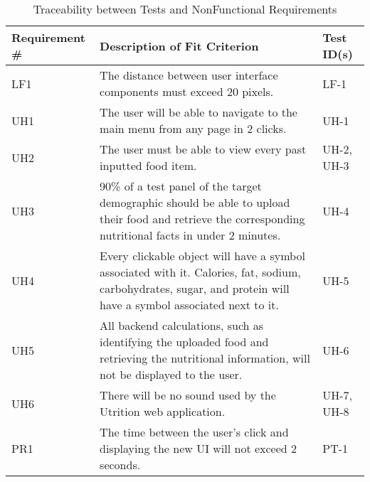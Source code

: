 \documentclass[12pt, titlepage]{article}
\begin{document}
	\begin{table}[H]
		\caption{Traceability between Tests and NonFunctional Requirements}
		\begin{tabularx}{\linewidth}{|l|X|l|}
			\hline
			{\bf Requirement \#} & {\bf Description of Fit Criterion} & {\bf Test ID(s)}\\
			\hline
			LF1 & The distance between user interface components must exceed 20 pixels. & LF-1 \\
			\hline
			UH1 & The user will be able to navigate to the main menu from any page in 2 clicks. & UH-1 \\
			\hline
			UH2 & The user must be able to view every past inputted food item. & UH-2, UH-3 \\
			\hline
			UH3 & 90\% of a test panel of the target demographic should be able to upload their food and retrieve the corresponding nutritional facts in under 2 minutes. & UH-4 \\
			\hline
			UH4 & Every clickable object will have a symbol associated with it. Calories, fat, sodium, carbohydrates, sugar, and protein will have a symbol associated next to it.
			& UH-5 \\
			\hline
			UH5 & All backend calculations, such as identifying the uploaded food and retrieving the nutritional information, will not be displayed to the user. & UH-6 \\
			\hline
			UH6 & There will be no sound used by the Utrition web application.  & UH-7, UH-8 \\
			\hline
			PR1 & The time between the user’s click and displaying the new UI will not exceed 2 seconds. & PT-1 \\
			\hline
		\end{tabularx}
		\label{tab:NonFunctional Traceability}
	\end{table}
\end{document}
